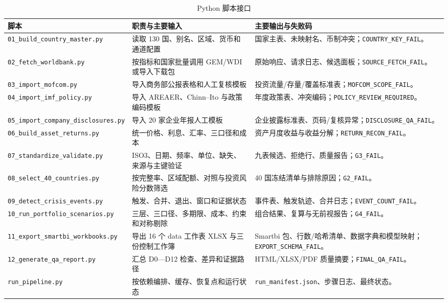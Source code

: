 \documentclass[UTF8,fontset=windows,12pt,openany]{ctexbook}
\newcommand{\Field}[1]{{\small\nolinkurl{#1}}}
\newcommand{\File}[1]{{\small\nolinkurl{#1}}}
\begin{document}
\begin{longtable}{p{4.3cm}p{4.5cm}p{4.6cm}}
\caption{Python 脚本接口}\label{tab:scripts}\\
\toprule
\textbf{脚本} & \textbf{职责与主要输入} & \textbf{主要输出与失败码}\\
\midrule
\File{01_build_country_master.py} & 读取 130 国、别名、区域、货币和通道配置 & 国家主表、未映射名、币制冲突；\Field{COUNTRY_KEY_FAIL}。\\
\File{02_fetch_worldbank.py} & 按指标和国家批量调用 GEM/WDI 或导入下载包 & 原始响应、请求日志、候选面板；\Field{SOURCE_FETCH_FAIL}。\\
\File{03_import_mofcom.py} & 导入商务部公报表格和人工复核模板 & 投资流量/存量/覆盖标准表；\Field{MOFCOM_SCOPE_FAIL}。\\
\File{04_import_imf_policy.py} & 导入 AREAER、Chinn--Ito 与政策编码模板 & 年度政策表、冲突编码；\Field{POLICY_REVIEW_REQUIRED}。\\
\File{05_import_company_disclosures.py} & 导入 20 家企业年报人工模板 & 企业披露标准表、页码/复核异常；\Field{DISCLOSURE_QA_FAIL}。\\
\File{06_build_asset_returns.py} & 统一价格、利息、汇率、三口径和成本 & 资产月度收益与收益分解；\Field{RETURN_RECON_FAIL}。\\
\File{07_standardize_validate.py} & ISO3、日期、频率、单位、缺失、来源与主键验证 & 九表候选、拒绝行、质量报告；\Field{G3_FAIL}。\\
\File{08_select_40_countries.py} & 按完整率、区域配额、对照与投资风险分数筛选 & 40 国冻结清单与排除原因；\Field{G2_FAIL}。\\
\File{09_detect_crisis_events.py} & 触发、合并、退出、窗口和证据状态 & 事件表、触发轨迹、合并日志；\Field{EVENT_COUNT_FAIL}。\\
\File{10_run_portfolio_scenarios.py} & 三层、三口径、多期限、成本、约束和对称剔除 & 组合结果、复算与无前视报告；\Field{G4_FAIL}。\\
\File{11_export_smartbi_workbooks.py} & 导出 16 个 data 工作表 XLSX 与三份控制工作簿 & Smartbi 包、行数/哈希清单、数据字典和模型映射；\Field{EXPORT_SCHEMA_FAIL}。\\
\File{12_generate_qa_report.py} & 汇总 D0—D12 检查、差异和证据路径 & HTML/XLSX/PDF 质量摘要；\Field{FINAL_QA_FAIL}。\\
\File{run_pipeline.py} & 按依赖编排、缓存、恢复点和运行状态 & \File{run_manifest.json}、步骤日志、最终状态。\\
\bottomrule
\end{longtable}
\end{document}
